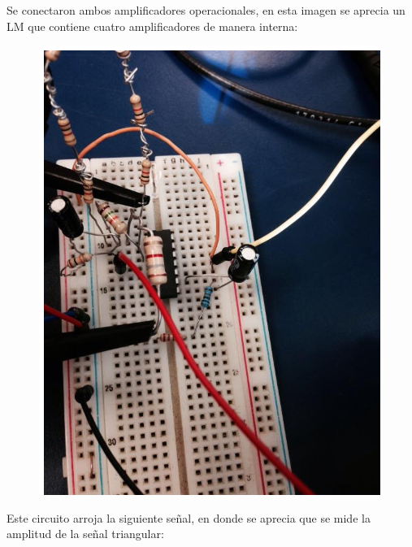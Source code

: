 \documentclass[12pt]{article}
\begin{document}

\par

\begin{Center}
\textcolor[HTML]{656565}{Se conectaron ambos amplificadores operacionales, en esta imagen se aprecia un LM que contiene cuatro amplificadores de manera interna:}
\end{Center}\par




\begin{figure}[H]
	\begin{Center}
		\includegraphics[width=4.41in,height=5.76in]{./media/image14.png}
	\end{Center}
\end{figure}



\par

\newpage
\begin{Center}
\textcolor[HTML]{656565}{Este circuito arroja la siguiente señal, en donde se aprecia que se mide la amplitud de la señal triangular:}
\end{Center}\par
\end{document}
